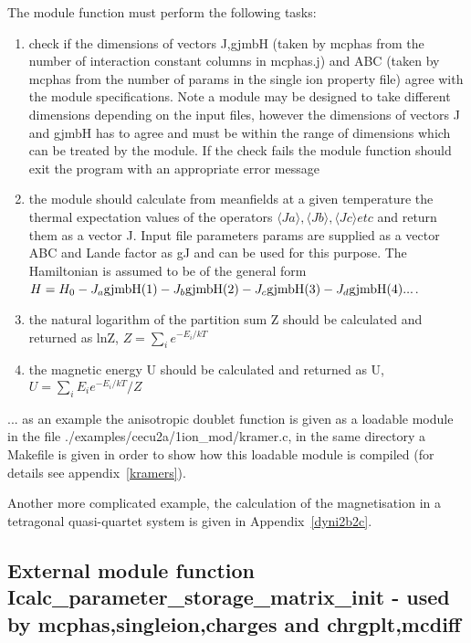 The module function must perform the following tasks:
\begin{enumerate}
\item check if the dimensions of vectors J,gjmbH (taken by {\prg mcphas} from the number of 
interaction constant columns in {\prg mcphas.j})
 and ABC (taken by {\prg mcphas} from the number of params in the single ion property
file) agree with the module specifications. Note a module may be designed to 
take different dimensions depending on the input files, however the dimensions
of vectors J and gjmbH has to agree and must be within the range of dimensions which
can be treated by the module. If the check fails the module function should exit the
program with an appropriate error message
\item the module should calculate from meanfields at a given temperature the 
thermal expectation values of the operators $\langle Ja\rangle, \langle Jb\rangle,\langle Jc\rangle etc$ and return them as
a vector J. Input file parameters params are supplied as a vector ABC and
Lande factor as gJ and  can be used for this purpose. The Hamiltonian
is assumed to be of the general form $H=H_0-J_a {\rm gjmbH}(1) -J_b {\rm gjmbH}(2) -J_c {\rm gjmbH}(3) -J_d {\rm %
gjmbH}(4) ...$.
\item the natural logarithm of the partition sum Z should be calculated and returned as lnZ,
$Z=\sum_i e^{-E_i/kT}$
\item the magnetic energy U should be calculated and returned as U, $U=\sum_i E_i e^{-E_i/kT}/Z$
\end{enumerate}

... as an example the anisotropic doublet function is given as a
loadable module in the file {\prg ./examples/cecu2a/1ion\_mod/kramer.c}, in the same
directory a Makefile is given in order to show how this loadable
module is compiled (for details see appendix~\ref{kramers}).

Another more complicated example, the calculation of the magnetisation
in a tetragonal quasi-quartet system is given in Appendix~\ref{dyni2b2c}.

\subsection{External module function {\prg Icalc\_parameter\_storage\_matrix\_init} - used by {\prg %
mcphas},{\prg singleion},{\prg charges} and {\prg %
chrgplt},{\prg mcdiff}  }

